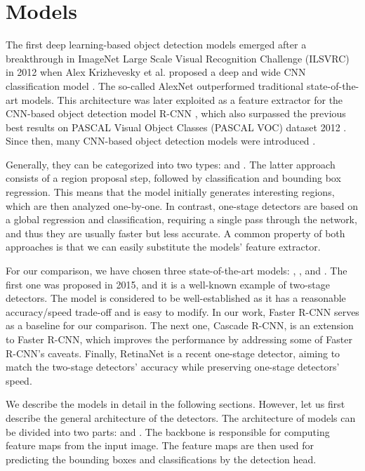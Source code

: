 \chapter{Models}
The first deep learning-based object detection models emerged after a
breakthrough in ImageNet Large Scale Visual Recognition Challenge (ILSVRC)
\cite{ILSVRC15} in 2012 when Alex Krizhevesky et al. proposed a deep
and wide CNN classification model \cite{alexnet}. The so-called AlexNet
outperformed traditional state-of-the-art models.  This architecture was
later exploited as a feature extractor for the CNN-based object detection
model R-CNN \cite{rcnn}, which also surpassed the previous best results on
PASCAL Visual Object Classes (PASCAL VOC) dataset 2012 \cite{voc}. Since then,
many CNN-based object detection models were introduced \cite{odreview}.

Generally, they can be categorized into two types: 
and . The latter approach consists of a region
proposal step, followed by classification and bounding box regression. This
means that the model initially generates interesting regions, which are then
analyzed one-by-one. In contrast, one-stage detectors are based on a global
regression and classification, requiring a single pass through the network,
and thus they are usually faster but less accurate. A common property of
both approaches is that we can easily substitute the models' feature extractor.

For our comparison, we have chosen three state-of-the-art models:  \cite{fasterrcnn},  \cite{cascadercnn}, and
 \cite{retinanet}. The first one was proposed in 2015, and
it is a well-known example of two-stage detectors. The model is considered
to be well-established as it has a reasonable accuracy/speed trade-off
and is easy to modify. In our work, Faster R-CNN serves as a baseline for
our comparison. The next one, Cascade R-CNN, is an extension to Faster
R-CNN, which improves the performance by addressing some of Faster R-CNN's
caveats. Finally, RetinaNet is a recent one-stage detector, aiming to match
the two-stage detectors' accuracy while preserving one-stage detectors' speed.

We describe the models in detail in the following sections. However, let us
first describe the general architecture of the detectors. The architecture
of models can be divided into two parts:  and . The backbone is responsible for computing feature maps from the input
image. The feature maps are then used for predicting the bounding boxes and
classifications by the detection head.

